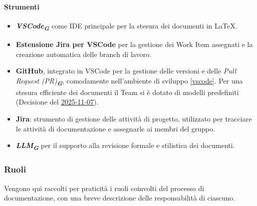 \documentclass[a4paper,12pt]{article}
\newcommand{\glossario}[1]{\textit{#1}\textsubscript{\textbf{\textit{\textcolor{lightblack}{G}}}}}
\begin{document}
\paragraph{Strumenti}
\begin{itemize}
    \item \glossario{\textbf{VSCode}} come IDE principale per la stesura dei documenti in \LaTeX.
    \item \textbf{Estensione Jira per VSCode} per la gestione dei Work Item assegnati e la creazione automatica delle branch di lavoro.
    \item \textbf{GitHub}, integrato in VSCode per la gestione delle versioni e delle \glossario{\textit{Pull Request (PR)}}, comodamente nell'ambiente di sviluppo \ref{vscode}.
          Per una stesura efficiente dei documenti il Team si è dotato di modelli predefiniti (Decisione del \href{https://7-zpus.github.io/Docs/assets/2_RTB/DocumentiInterni/Verbali/2025-11-07-VerbaleInterno.pdf}{2025-11-07}).
    \item \textbf{Jira}: strumento di gestione delle attività di progetto, utilizzato per tracciare le attività di documentazione e assegnarle ai membri del gruppo.
    \item \glossario{\textbf{LLM}} per il supporto alla revisione formale e stilistica dei documenti.
\end{itemize}

\subsubsection{Ruoli}
Vengono qui raccolti per praticità i ruoli coinvolti del processo di
documentazione, con una breve descrizione delle responsabilità di ciascuno.
\end{document}
